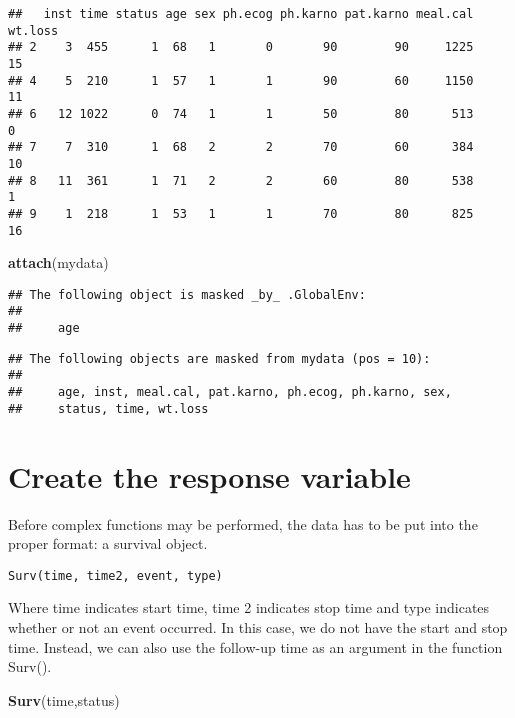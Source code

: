 \documentclass[]{book}
\newenvironment{Shaded}{\begin{snugshade}}{\end{snugshade}}
\newcommand{\KeywordTok}[1]{\textcolor[rgb]{0.13,0.29,0.53}{\textbf{#1}}}
\newcommand{\NormalTok}[1]{#1}
\theoremstyle{definition}
\theoremstyle{definition}
\theoremstyle{definition}
\theoremstyle{remark}
\begin{document}
\begin{verbatim}
##   inst time status age sex ph.ecog ph.karno pat.karno meal.cal wt.loss
## 2    3  455      1  68   1       0       90        90     1225      15
## 4    5  210      1  57   1       1       90        60     1150      11
## 6   12 1022      0  74   1       1       50        80      513       0
## 7    7  310      1  68   2       2       70        60      384      10
## 8   11  361      1  71   2       2       60        80      538       1
## 9    1  218      1  53   1       1       70        80      825      16
\end{verbatim}

\begin{Shaded}
\begin{Highlighting}[]
\KeywordTok{attach}\NormalTok{(mydata)}
\end{Highlighting}
\end{Shaded}

\begin{verbatim}
## The following object is masked _by_ .GlobalEnv:
## 
##     age
\end{verbatim}

\begin{verbatim}
## The following objects are masked from mydata (pos = 10):
## 
##     age, inst, meal.cal, pat.karno, ph.ecog, ph.karno, sex,
##     status, time, wt.loss
\end{verbatim}

\section{Create the response
variable}\label{create-the-response-variable}

Before complex functions may be performed, the data has to be put into
the proper format: a survival object.

\begin{verbatim}
Surv(time, time2, event, type)
\end{verbatim}

Where time indicates start time, time 2 indicates stop time and type
indicates whether or not an event occurred. In this case, we do not have
the start and stop time. Instead, we can also use the follow-up time as
an argument in the function Surv().

\begin{Shaded}
\begin{Highlighting}[]
\KeywordTok{Surv}\NormalTok{(time,status)}
\end{Highlighting}
\end{Shaded}
\end{document}
